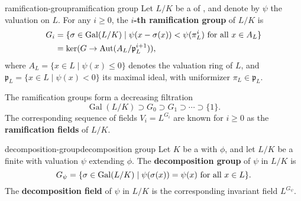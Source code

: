 \begin{topic}{ramification-group}{ramification group}
    Let $L/K$ be a  of  , and denote by $\psi$ the valuation on $L$.
    For any $i \ge 0$, the \textbf{$i$-th ramification group} of $L/K$ is
    \[ \begin{aligned}
        G_i &= \{ \sigma \in \operatorname{Gal}(L/K) \mid \psi(x - \sigma(x)) < \psi(\pi_L^i) \textup{ for all } x \in A_L \} \\
        &= \ker(G \to \operatorname{Aut}(A_L/\mathfrak{p}_L^{i + 1})) ,
    \end{aligned} \]
    where $A_L = \{ x \in L \mid \psi(x) \le 0 \}$ denotes the valuation ring of $L$, and $\mathfrak{p}_L = \{ x \in L \mid \psi(x) < 0 \}$ its maximal ideal, with uniformizer $\pi_L \in \mathfrak{p}_L$.
    
    The ramification groups form a decreasing filtration
    \[ \operatorname{Gal}(L/K) \supset G_0 \supset G_1 \supset \cdots \supset \{ 1 \} . \]
    The corresponding sequence of fields $V_i = L^{G_i}$ are known for $i \ge 0$ as the \textbf{ramification fields} of $L/K$.
\end{topic}

\begin{topic}{decomposition-group}{decomposition group}
    Let $K$ be a  with  $\phi$, and let $L/K$ be a finite  with valuation $\psi$ extending $\phi$. The \textbf{decomposition group} of $\psi$ in $L/K$ is
    \[ G_\psi = \{ \sigma \in \operatorname{Gal}(L/K) \mid \psi(\sigma(x)) = \psi(x) \textup{ for all } x \in L \} . \]
    The \textbf{decomposition field} of $\psi$ in $L/K$ is the corresponding invariant field $L^{G_\psi}$.
\end{topic}
